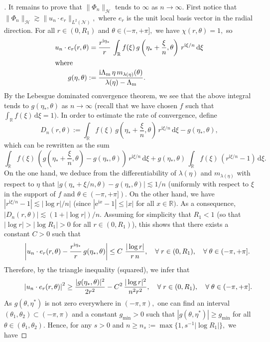 \documentclass[AHL,Unicode,longabstracts]{cedram}
\newcommand{\calH}{\mathcal{H}}
\newcommand{\calN}{\mathcal{N}}
\newcommand{\bbR}{\mathbb{R}}
\newcommand{\rmd}{{\mathrm{d}}}
\newcommand{\rme}{{\mathrm{e}}}
\newcommand{\rmi}{{\mathrm{i}}}
\newcommand{\Lm}{{\Lambda_{\mathrm{m}}}}
\newcounter{stepcount}
\renewcommand{\thestepcount}{\roman{stepcount}}
\newenvironment{step}{\refstepcounter{stepcount}\begin{proof}[\thestepcount]}{\let\qed\relax\end{proof}}
\let\oldforall\forall
\renewcommand*{\forall}{\mathrel{\oldforall}}
\begin{document}
\begin{proofc}
\begin{step}\label{listproofprop3.7.4}
It remains to prove that $\| \Phi_n \|_\calH$ tends to $\infty$ as $n \to \infty$. First notice that $\| \Phi_n \|_\calH \gtrsim \| u_n\cdot e_r \|_{L^2(\calN)},$ where $e_r$ is the unit local basis vector in the radial direction. For all $r \in (0,R_1)$ and $\theta \in (-\pi,+\pi],$ we have $\chi(r,\theta) = 1,$ so
\begin{align*}
u_n\cdot e_r(r,\theta) =&\;\frac{r^{\rmi\eta_*}}{r}\,
\int_{\bbR} f(\xi)\, g\left(\eta_* + \frac{\xi}{n},\theta\right)\,r^{\rmi\xi/n} \,\rmd \xi\\
\intertext{where}
 g(\eta,\theta) :=&\;\frac{\rmi\Lm\,\eta\,m_{\lambda(\eta)}(\theta)}{\lambda(\eta)-\Lm}.
\end{align*}
By the Lebesgue dominated convergence theorem, we see that the above integral tends to $g(\eta_*,\theta)$ as $n \to \infty$ (recall that we have chosen $f$ such that $\int_{\bbR} f(\xi) \,\rmd \xi = 1).$ In order to estimate the rate of convergence, define
\[
D_n(r,\theta) := \int_{\bbR} f(\xi)\, g\left(\eta_* + \frac{\xi}{n},\theta\right)
\,r^{\rmi\xi/n} \,\rmd \xi - g(\eta_*,\theta),
\]
which can be rewritten as the sum
\[
\int_{\bbR} f(\xi)\, \left(g\left(\eta_* + \frac{\xi}{n},\theta\right) - g(\eta_*,\theta)\right)\,r^{\rmi\xi/n} \,\rmd \xi + g(\eta_*,\theta)\,\int_{\bbR} f(\xi)\, \left(r^{\rmi\xi/n} - 1 \right) \,\rmd \xi.
\]
On the one hand, we deduce from the differentiability of $\lambda(\eta)$ and $m_{\lambda(\eta)}$ with respect to $\eta$ that $| g(\eta_* + \xi/n,\theta) - g(\eta_*,\theta)| \lesssim 1/n$ (uniformly with respect to $\xi$ in the support of $f$ and $\theta \in (-\pi,+\pi]).$ On the other hand, we have $|r^{\rmi\xi/n} - 1| \lesssim |\log r|/n|$ (since $|\rme^{\rmi x} - 1| \leq |x|$ for all $x \in \bbR).$ As a consequence, $|D_n(r,\theta)| \lesssim (1 +|\log r|)/n.$ Assuming for simplicity that $R_1 < 1$ (so that $|\log r| > |\log R_1| > 0$ for all $r \in (0,R_1)$), this shows that there exists a constant $C>0$ such that
\[
\mkern40mu\left| u_n\cdot e_r(r,\theta) - \frac{r^{\rmi\eta_*}}{r}\, g(\eta_*,\theta) \right|
\leq C\ \frac{|\log r|}{r\,n},
\quad \forall r \in (0,R_1), \quad \forall \theta \in (-\pi,+\pi].
\]
Therefore, by the triangle inequality (squared), we infer that
\[
\mkern45mu\left| u_n\cdot e_r(r,\theta) \right|^2
\geq \frac{|g(\eta_*,\theta)|^2}{2r^2} - C^2\,\frac{|\log r|^2}{n^2r^2},
\quad \forall r \in (0,R_1), \quad \forall \theta \in (-\pi,+\pi].
\]
As $g(\theta,\eta^*)$ is not zero everywhere in $(-\pi,\pi),$ one can find an interval $(\theta_1,\theta_2) \subset (-\pi,\pi)$ and a constant $g_{\min} > 0$ such that $|g(\theta,\eta^*)| \geq g_{\min}$ for all $\theta \in (\theta_1,\theta_2).$ Hence, for any $s > 0$ and $n \geq n_s := \max\big\{1,s^{-1}|\log R_1|\big\},$ we have

\end{step}
\end{proofc}
\end{document}
